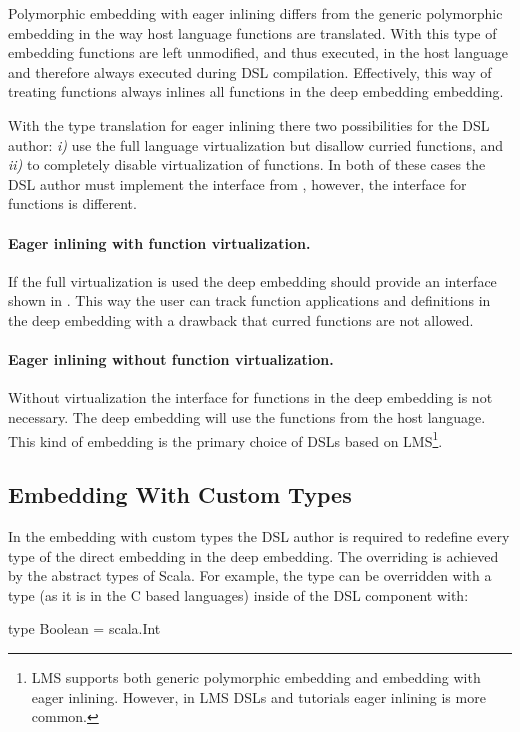 Polymorphic embedding with eager inlining differs from the generic polymorphic embedding in
the way host language functions are translated. With this type of embedding functions
are left unmodified, and thus executed, in the host language and therefore always executed during DSL compilation. Effectively,
this way of treating functions always inlines all functions in the deep embedding embedding.

With the type translation for eager inlining there two possibilities for the DSL author: \emph{i)} use the full language virtualization but disallow curried functions, and
\emph{ii)} to completely disable virtualization of functions. In both of these cases the DSL author
must implement the interface  from , however, the interface
for functions is different.

\paragraph{Eager inlining with function virtualization.} If the full virtualization
is used the deep embedding should provide an interface shown in . This way the user can track function applications and definitions in the deep embedding with
a drawback that curred functions are not allowed.

\paragraph{Eager inlining without function virtualization.} Without virtualization the interface
for functions in the deep embedding is not necessary. The deep embedding will use the
functions from the host language. This kind of embedding is the primary choice of DSLs based on LMS\footnote{LMS supports both generic polymorphic embedding and embedding with eager inlining. However, in LMS DSLs and tutorials eager inlining is more common.}.

\subsection{Embedding With Custom Types}
\label{sec:embedding-with-custom-types}

In the embedding with custom types the DSL author is required to redefine every
type of the direct embedding in the deep embedding. The overriding is achieved by
the abstract types of Scala. For example, the type  can be overridden
with a type  (as it is in the C based languages) inside of the DSL component with:\begin{lstparagraph}
type Boolean = scala.Int
\end{lstparagraph}

